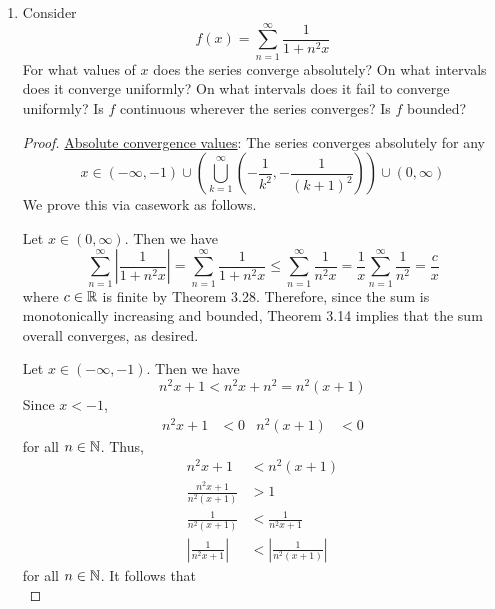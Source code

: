 \documentclass[../psets.tex]{subfiles}
\begin{document}
\begin{enumerate}[label={\textbf{\arabic*.}}]
\begin{proof}
    \end{proof}
    \item Consider
    \begin{equation*}
        f(x) = \sum_{n=1}^\infty\frac{1}{1+n^2x}
    \end{equation*}
    For what values of $x$ does the series converge absolutely? On what intervals does it converge uniformly? On what intervals does it fail to converge uniformly? Is $f$ continuous wherever the series converges? Is $f$ bounded?
    \begin{proof}
        \underline{Absolute convergence values}: The series converges absolutely for any
        \begin{equation*}
            x \in (-\infty,-1)\cup\left( \bigcup_{k=1}^\infty\left( -\frac{1}{k^2},-\frac{1}{(k+1)^2} \right) \right)\cup(0,\infty)
        \end{equation*}
        We prove this via casework as follows.\par
        Let $x\in(0,\infty)$. Then we have
        \begin{equation*}
            \sum_{n=1}^\infty\left| \frac{1}{1+n^2x} \right| = \sum_{n=1}^\infty\frac{1}{1+n^2x}
            \leq \sum_{n=1}^\infty\frac{1}{n^2x}
            = \frac{1}{x}\sum_{n=1}^\infty\frac{1}{n^2}
            = \frac{c}{x}
        \end{equation*}
        where $c\in\mathbb{R}$ is finite by Theorem 3.28. Therefore, since the sum is monotonically increasing and bounded, Theorem 3.14 implies that the sum overall converges, as desired.\par
        Let $x\in(-\infty,-1)$. Then we have
        \begin{equation*}
            n^2x+1 < n^2x+n^2 = n^2(x+1)
        \end{equation*}
        Since $x<-1$,
        \begin{align*}
            n^2x+1 &< 0&
            n^2(x+1) &< 0
        \end{align*}
        for all $n\in\mathbb{N}$. Thus,
        \begin{align*}
            n^2x+1 &< n^2(x+1)\\
            \frac{n^2x+1}{n^2(x+1)} &> 1\\
            \frac{1}{n^2(x+1)} &< \frac{1}{n^2x+1}\\
            \left| \frac{1}{n^2x+1} \right| &< \left| \frac{1}{n^2(x+1)} \right|
        \end{align*}
        for all $n\in\mathbb{N}$. It follows that
        \begin{equation*}

\end{equation*}
\end{proof}
\end{enumerate}
\end{document}
